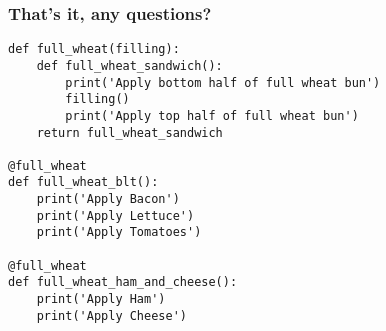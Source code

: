 \documentclass{beamer}
\begin{document}
\begin{frame}[fragile]
  \frametitle{That's it, any questions?}
  \small
\begin{verbatim}
def full_wheat(filling):
    def full_wheat_sandwich():
        print('Apply bottom half of full wheat bun')
        filling()
        print('Apply top half of full wheat bun')
    return full_wheat_sandwich

@full_wheat
def full_wheat_blt():
    print('Apply Bacon')
    print('Apply Lettuce')
    print('Apply Tomatoes')

@full_wheat
def full_wheat_ham_and_cheese():
    print('Apply Ham')
    print('Apply Cheese')
\end{verbatim}
\end{frame}
\end{document}

